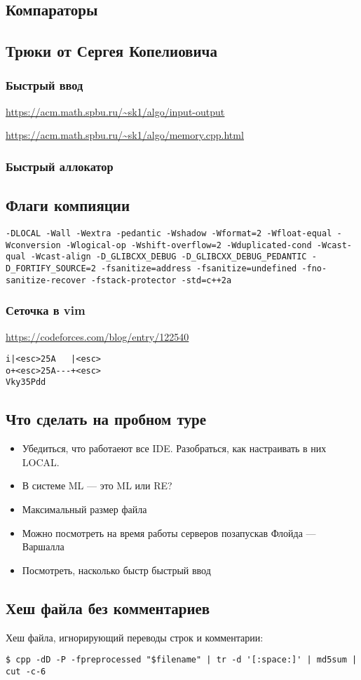 \subsection{Компараторы}

\subsection{Трюки от Сергея Копелиовича}
\subsubsection{Быстрый ввод}
\underline{\url{https://acm.math.spbu.ru/~sk1/algo/input-output}}

\underline{\url{https://acm.math.spbu.ru/~sk1/algo/memory.cpp.html}}
\subsubsection{Быстрый аллокатор}

\subsection{Флаги компияции}
\texttt{-DLOCAL -Wall -Wextra -pedantic -Wshadow -Wformat=2 -Wfloat-equal -Wconversion -Wlogical-op -Wshift-overflow=2 -Wduplicated-cond -Wcast-qual -Wcast-align -D\_GLIBCXX\_DEBUG -D\_GLIBCXX\_DEBUG\_PEDANTIC -D\_FORTIFY\_SOURCE=2 -fsanitize=address -fsanitize=undefined -fno-sanitize-recover -fstack-protector -std=c++2a}
\subsubsection{Сеточка в vim}
\underline{\url{https://codeforces.com/blog/entry/122540}}

\begin{lstlisting}
i|<esc>25A   |<esc>
o+<esc>25A---+<esc>
Vky35Pdd
\end{lstlisting}
\subsection{Что сделать на пробном туре}
\begin{itemize}
\item Убедиться, что работаеют все IDE.
Разобраться, как настраивать в них LOCAL.
\item В системе ML --- это ML или RE?
\item Максимальный размер файла
\item Можно посмотреть на время работы серверов позапускав Флойда --- Варшалла
\item Посмотреть, насколько быстр быстрый ввод
\end{itemize}
\subsection{Хеш файла без комментариев}
Хеш файла, игнорирующий переводы строк и комментарии:
\begin{lstlisting}
$ cpp -dD -P -fpreprocessed "$filename" | tr -d '[:space:]' | md5sum | cut -c-6
\end{lstlisting}
